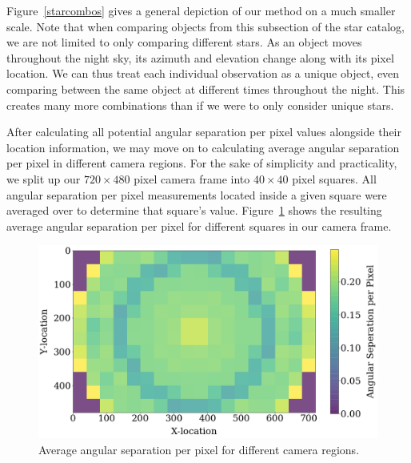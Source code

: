Figure~\ref{starcombos} gives a general depiction of our method on a much smaller scale.
Note that when comparing objects from this subsection of the star catalog, we are not limited to only comparing different stars.
As an object moves throughout the night sky, its azimuth and elevation change along with its pixel location.
We can thus treat each individual observation as a unique object, even comparing between the same object at different times throughout the night.
This creates many more combinations than if we were to only consider unique stars.

After calculating all potential angular separation per pixel values alongside their location information, we may move on to calculating average angular separation per pixel in different camera regions.
For the sake of simplicity and practicality, we split up our $720 \times 480$ pixel camera frame into $40 \times 40$ pixel squares.
All angular separation per pixel measurements located inside a given square were averaged over to determine that square's value.
Figure~\ref{colorful2} shows the resulting average angular separation per pixel for different squares in our camera frame.

\begin{figure}[ht!]
  \centering
  \includegraphics[scale=0.35]{images/boxes_colored.png}
  \caption{Average angular separation per pixel for different camera regions. }
  \label{colorful2}
\end{figure}


